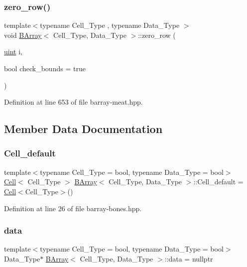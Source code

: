 \subsubsection{\texorpdfstring{zero\+\_\+row()}{zero\_row()}}
{\footnotesize\ttfamily template$<$typename Cell\+\_\+\+Type , typename Data\+\_\+\+Type $>$ \\
void \hyperlink{class_b_array}{B\+Array}$<$ Cell\+\_\+\+Type, Data\+\_\+\+Type $>$\+::zero\+\_\+row (\begin{DoxyParamCaption}\item[{\hyperlink{typedefs_8hpp_a91ad9478d81a7aaf2593e8d9c3d06a14}{uint}}]{i,  }\item[{bool}]{check\+\_\+bounds = {\ttfamily true} }\end{DoxyParamCaption})\hspace{0.3cm}{\ttfamily [inline]}}



Definition at line 653 of file barray-\/meat.\+hpp.



\subsection{Member Data Documentation}
\mbox{\label{class_b_array_a5700cd9bb3814f84c62dda0ea47931bc}} 
\subsubsection{\texorpdfstring{Cell\+\_\+default}{Cell\_default}}
{\footnotesize\ttfamily template$<$typename Cell\+\_\+\+Type = bool, typename Data\+\_\+\+Type = bool$>$ \\
\hyperlink{class_cell}{Cell}$<$ Cell\+\_\+\+Type $>$ \hyperlink{class_b_array}{B\+Array}$<$ Cell\+\_\+\+Type, Data\+\_\+\+Type $>$\+::Cell\+\_\+default = \hyperlink{class_cell}{Cell}$<$Cell\+\_\+\+Type$>$()\hspace{0.3cm}{\ttfamily [static]}}



Definition at line 26 of file barray-\/bones.\+hpp.

\mbox{\label{class_b_array_a9576163b52124021575e50dbcca2f6b9}} 
\subsubsection{\texorpdfstring{data}{data}}
{\footnotesize\ttfamily template$<$typename Cell\+\_\+\+Type = bool, typename Data\+\_\+\+Type = bool$>$ \\
Data\+\_\+\+Type$\ast$ \hyperlink{class_b_array}{B\+Array}$<$ Cell\+\_\+\+Type, Data\+\_\+\+Type $>$\+::data = nullptr}



